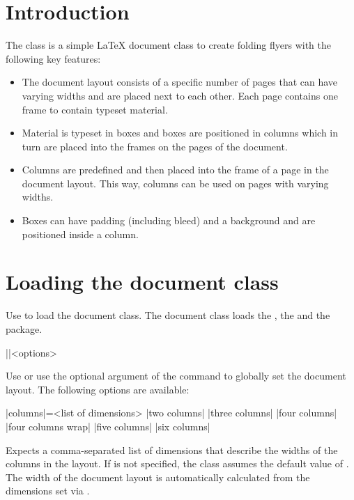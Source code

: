 \documentclass[a4paper]{article}
\begin{document}
\printdoctitle
\bigskip

\section{Introduction}

The  class is a simple LaTeX document class to create folding flyers with the following key features:

\begin{itemize}
    \item The document layout consists of a specific number of pages that can have varying widths and are placed next to each other. Each page contains one frame to contain typeset material.
    \item Material is typeset in boxes and boxes are positioned in columns which in turn are placed into the frames on the pages of the document.
    \item Columns are predefined and then placed into the frame of a page in the document layout. This way, columns can be used on pages with varying widths.
    \item Boxes can have padding (including bleed) and a background and are positioned inside a column.
\end{itemize}

\section{Loading the document class}

Use  to load the document class. The document class loads the , the  and the  package.

\begin{macrodef}
|\leporelloset|{<options>}
\end{macrodef}
Use \macro{\leporelloset} or use the optional argument of the \macro{\documentclass} command to globally set the document layout. The following options are available:

\begin{macrodef}
|columns|={<list of dimensions>}
|two columns|
|three columns|
|four columns|
|four columns wrap|
|five columns|
|six columns|
\end{macrodef}
Expects a comma-separated list of dimensions that describe the widths of the columns in the layout. If  is not specified, the class assumes the default value of \macro{97mm, 100mm, 100mm}. The width of the document layout is automatically calculated from the dimensions set via .
\end{document}

